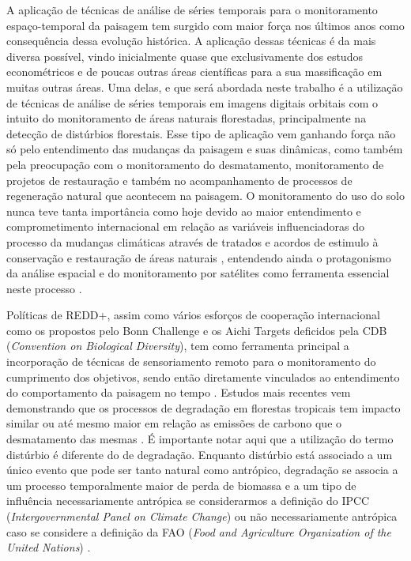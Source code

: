 A aplicação de técnicas de análise de séries temporais para o monitoramento espaço-temporal da paisagem tem surgido com maior força nos últimos anos como consequência dessa evolução histórica. A aplicação dessas técnicas é da mais diversa possível, vindo inicialmente quase que exclusivamente dos estudos econométricos e de poucas outras áreas científicas para a sua massificação em muitas outras áreas. Uma delas, e que será abordada neste trabalho é a utilização de técnicas de análise de séries temporais em imagens digitais orbitais com o intuito do monitoramento de áreas naturais florestadas, principalmente na detecção de distúrbios florestais. Esse tipo de aplicação vem ganhando força não só pelo entendimento das mudanças da paisagem e suas dinâmicas, como também pela preocupação com o monitoramento do desmatamento, monitoramento de projetos de restauração e também no acompanhamento de processos de regeneração natural que acontecem na paisagem. O monitoramento do uso do solo nunca teve tanta importância como hoje devido ao maior entendimento e comprometimento internacional em relação as variáveis influenciadoras do processo da mudanças climáticas através de tratados e acordos de estimulo à conservação e restauração de áreas naturais \citep{ALMEIDA201934}, entendendo ainda o protagonismo da análise espacial e do monitoramento por satélites como ferramenta essencial neste processo \citep{WHITE2019}. 

Políticas de REDD+, assim como vários esforços de cooperação internacional como os propostos pelo Bonn Challenge e os Aichi Targets deficidos pela CDB (\textit{Convention on Biological Diversity}), tem como ferramenta principal a incorporação de técnicas de sensoriamento remoto para o monitoramento do cumprimento dos objetivos, sendo então diretamente vinculados ao entendimento do comportamento da paisagem no tempo \citep{BOS2019295, CROUZEILLES2019}. Estudos mais recentes vem demonstrando que os processos de degradação em florestas tropicais tem impacto similar ou até mesmo maior em relação as emissões de carbono que o desmatamento das mesmas \citep{Harris1573, Houghton2012, Grace2014}. É importante notar aqui que a utilização do termo distúrbio é diferente do de degradação. Enquanto distúrbio está associado a um único evento que pode ser tanto natural como antrópico, degradação se associa a um processo temporalmente maior de perda de biomassa e a um tipo de influência necessariamente antrópica se considerarmos a definição do IPCC (\textit{Intergovernmental Panel on Climate Change}) ou não necessariamente antrópica caso se considere a definição da FAO (\textit{Food and Agriculture Organization of the United Nations}) \citep{Hirschmugl2017}. 

